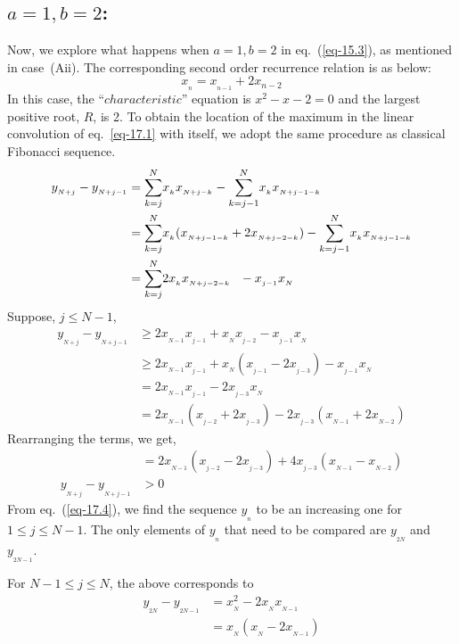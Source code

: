 \begin{multicols}{2}
\section{\underline{$a=1, b = 2$}:}\label{section-17}
Now, we explore what happens when $a=1, b=2$ in eq.~(\ref{eq-15.3}), as mentioned in case~(Aii). The corresponding second order recurrence relation is as below:
\begin{equation}
x_{_n} =  x_{_{n-1}} + 2x_{{n-2}}\label{eq-17.1}
\end{equation}
In this case, the ``$characteristic$'' equation is $x^2 - x - 2 = 0$ and the largest positive root, $R$, is 2. To obtain the location of the maximum in the linear convolution of eq.~\ref{eq-17.1} with itself, we adopt the same procedure as classical Fibonacci sequence.
{\fontsize{9}{9}\selectfont\begin{align}
y_{_{N+j}} - y_{_{N+j-1}} &= \displaystyle{\sum_{k=j}^{N}}x_{_{k}}x_{_{N+j-k}} -  \displaystyle{\sum_{k=j-1}^{N}}x_{_k}x_{_{N+j-1-k}}\nonumber\\
&= \displaystyle{\sum_{k=j}^{N}}x_{_{k}}(x_{_{N+j-1-k}}+2x_{_{N+j-2-k}}) -  \displaystyle{\sum_{k=j-1}^{N}}x_{_k}x_{_{N+j-1-k}}\label{eq-17.2}\\
&= \displaystyle{\sum_{k=j}^{N}}2x_{_{k}}x_{_{N+j-2-k}} \hspace{0.1in}- x_{_{j-1}}x_{_N}\label{eq-17.3}
\end{align}}
Suppose, $j \leq N-1$,
\begin{align}
y_{_{N+j}} - y_{_{N+j-1}}&\geq 2x_{_{N-1}}x_{_{j-1}} + x_{_N}x_{_{j-2}} - x_{_{j-1}}x_{_N}\nonumber\\
&\geq 2x_{_{N-1}}x_{_{j-1}} + x_{_N}(x_{_{j-1}}-2x_{_{j-3}})- x_{_{j-1}}x_{_N}\nonumber\\
&= 2x_{_{N-1}}x_{_{j-1}} - 2x_{_{j-3}}x_{_N}\nonumber\\
&= 2x_{_{N-1}}(x_{_{j-2}}+2x_{_{j-3}}) - 2x_{_{j-3}}(x_{_{N-1}}+2x_{_{N-2}})\nonumber
\end{align}
Rearranging the terms, we get,
\begin{align}
&= 2x_{_{N-1}}(x_{_{j-2}} - 2x_{_{j-3}}) + 4x_{_{j-3}}(x_{_{N-1}} - x_{_{N-2}})\nonumber\\
y_{_{N+j}} - y_{_{N+j-1}}&> 0\label{eq-17.4}
\end{align}
From eq.~(\ref{eq-17.4}), we find the sequence $y_{_n}$ to be an increasing one for $1 \leq j \leq N-1$. The only elements of $y_{_n}$ that need to be compared are $y_{_{2N}}$ and $y_{_{2N-1}}$.

For\hspace{0.1in} $N-1 \leq j \leq N$,\hspace{0.1in} the above corresponds to
\begin{align}
y_{_{2N}} - y_{_{2N-1}} &= x_{_N}^2 - 2x_{_N}x_{_{N-1}}\label{eq-17.5}\\
&= x_{_N}(x_{_N} - 2x_{_{N-1}})\label{eq-17.6}
\end{align} 


\end{multicols}
